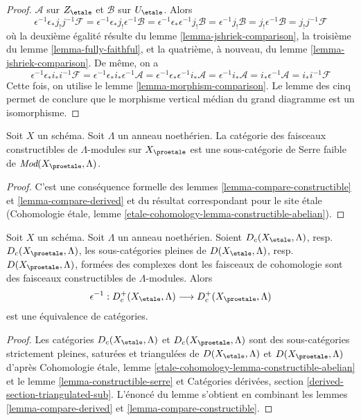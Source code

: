 \begin{proof}
$\mathcal{A}$ sur $Z_\etale$ et $\mathcal{B}$ sur $U_\etale$.
Alors
$$
\epsilon^{-1}\epsilon_*j_!j^{-1}\mathcal{F} =
\epsilon^{-1}\epsilon_*j_!\epsilon^{-1}\mathcal{B} =
\epsilon^{-1}\epsilon_*\epsilon^{-1}j_!\mathcal{B} =
\epsilon^{-1}j_!\mathcal{B} =
j_!\epsilon^{-1}\mathcal{B} =
j_!j^{-1}\mathcal{F}
$$
où la deuxième égalité résulte du lemme \ref{lemma-jshriek-comparison},
la troisième du lemme \ref{lemma-fully-faithful}, et la
quatrième, à nouveau, du lemme \ref{lemma-jshriek-comparison}.
De même, on a
$$
\epsilon^{-1}\epsilon_*i_*i^{-1}\mathcal{F} =
\epsilon^{-1}\epsilon_*i_*\epsilon^{-1}\mathcal{A} =
\epsilon^{-1}\epsilon_*\epsilon^{-1}i_*\mathcal{A} =
\epsilon^{-1}i_*\mathcal{A} =
i_*\epsilon^{-1}\mathcal{A} =
i_*i^{-1}\mathcal{F}
$$
Cette fois, on utilise le lemme \ref{lemma-morphism-comparison}.
Le lemme des cinq permet de conclure que le
morphisme vertical médian du grand diagramme est un isomorphisme.
\end{proof}

\begin{lemma}
\label{lemma-constructible-serre}
Soit $X$ un schéma. Soit $\Lambda$ un anneau noethérien.
La catégorie des faisceaux constructibles de $\Lambda$-modules sur $X_\proetale$
est une sous-catégorie de Serre faible de $\textit{Mod}(X_\proetale, \Lambda)$.
\end{lemma}

\begin{proof}
C'est une conséquence formelle des
lemmes \ref{lemma-compare-constructible} et \ref{lemma-compare-derived}
et du résultat correspondant pour le site \'etale
(Cohomologie \'etale, lemme \ref{etale-cohomology-lemma-constructible-abelian}).
\end{proof}

\begin{lemma}
\label{lemma-compare-constructible-derived}
Soit $X$ un schéma. Soit $\Lambda$ un anneau noethérien.
Soient $D_c(X_\etale, \Lambda)$, resp.\ $D_c(X_\proetale, \Lambda)$,
les sous-catégories pleines de
$D(X_\etale, \Lambda)$, resp.\ $D(X_\proetale, \Lambda)$,
formées des complexes dont les faisceaux de cohomologie sont des
faisceaux constructibles de $\Lambda$-modules. Alors
$$
\epsilon^{-1} :
D_c^+(X_\etale, \Lambda)
\longrightarrow
D_c^+(X_\proetale, \Lambda)
$$
est une équivalence de catégories.
\end{lemma}

\begin{proof}
Les catégories $D_c(X_\etale, \Lambda)$ et $D_c(X_\proetale, \Lambda)$
sont des sous-catégories strictement pleines, saturées et triangulées de
$D(X_\etale, \Lambda)$ et $D(X_\proetale, \Lambda)$ d'après
Cohomologie \'etale, lemme \ref{etale-cohomology-lemma-constructible-abelian}
et
le lemme \ref{lemma-constructible-serre}
et
Catégories dérivées, section \ref{derived-section-triangulated-sub}.
L'énoncé du lemme s'obtient en combinant les
lemmes \ref{lemma-compare-derived} et
\ref{lemma-compare-constructible}.
\end{proof}

